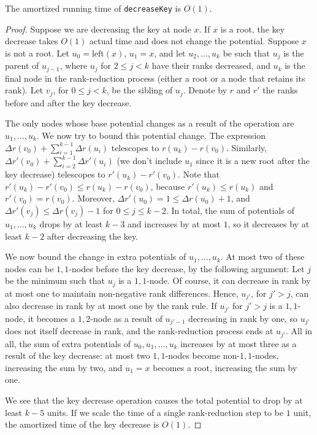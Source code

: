 \begin{lemma}
The amortized running time of \texttt{decreaseKey} is \(O(1)\).
\end{lemma}
\begin{proof}
Suppose we are decreasing the key at node \(x\). If \(x\) is a root, the key decrease takes \(O(1)\) actual time and does not change the potential. Suppose \(x\) is not a root. Let \(u_0 = \text{left}(x)\), \(u_1 = x\), and let \(u_2, \ldots, u_k\) be such that \(u_j\) is the parent of \(u_{j-1}\), where \(u_j\) for \(2 \leq j < k\) have their ranks decreased, and \(u_k\) is the final node in the rank-reduction process (either a root or a node that retains its rank). Let \(v_j\), for \(0 \leq j < k\), be the sibling of \(u_{j}\). Denote by \(r\) and \(r'\) the ranks before and after the key decrease.

The only nodes whose base potential changes as a result of the operation are \(u_1, \ldots, u_k\). We now try to bound this potential change. The expression \(\Delta r(v_0) + \sum_{i=1}^{k-1}\Delta r(u_i)\) telescopes to \(r(u_k) - r(v_0)\). Similarly, \(\Delta r'(v_0) + \sum_{i=2}^{k-1}\Delta r'(u_i)\) (we don't include \(u_1\) since it is a new root after the key decrease) telescopes to \(r'(u_k) - r'(v_0)\). Note that \(r'(u_k) - r'(v_0) \leq r(u_k) - r(v_0)\), because \(r'(u_k) \leq r(u_k)\) and \(r'(v_0) = r(v_0)\). Moreover, \(\Delta r'(u_0) = 1 \leq \Delta r(u_0) + 1\), and \(\Delta r'(v_j) \leq \Delta r(v_j) - 1\) for \(0 \leq j \leq k-2\). In total, the sum of potentials of \(u_1, \ldots, u_k\) drops by at least \(k - 3\) and increases by at most \(1\), so it decreases by at least \(k - 2\) after decreasing the key.

We now bound the change in extra potentials of \(u_1, \ldots, u_k\). At most two of these nodes can be \(1,1\)-nodes before the key decrease, by the following argument: Let \(j\) be the minimum such that \(u_j\) is a \(1,1\)-node. Of course, it can decrease in rank by at most one to maintain non-negative rank differences. Hence, \(u_{j'}\), for \(j' > j\), can also decrease in rank by at most one by the rank rule. If \(u_{j'}\) for \(j' > j\) is a \(1,1\)-node, it becomes a \(1,2\)-node as a result of \(u_{j'-1}\) decreasing in rank by one, so \(u_{j'}\) does not itself decrease in rank, and the rank-reduction process ends at \(u_{j'}\). All in all, the sum of extra potentials of \(u_0, u_1, \ldots, u_k\) increases by at most three as a result of the key decrease: at most two \(1,1\)-nodes become non-\(1,1\)-nodes, increasing the sum by two, and \(u_1 = x\) becomes a root, increasing the sum by one.

We see that the key decrease operation causes the total potential to drop by at least \(k - 5\) units. If we scale the time of a single rank-reduction step to be \(1\) unit, the amortized time of the key decrease is \(O(1)\).
\end{proof}
